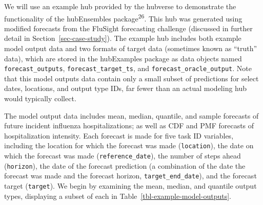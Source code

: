 \documentclass[
  letterpaper,
  DIV=11,
  numbers=noendperiod]{scrartcl}
\begin{document}
We will use an example hub provided by the hubverse to demonstrate the
functionality of the {hubEnsembles} package\textsuperscript{26}. This
hub was generated using modified forecasts from the FluSight forecasting
challenge (discussed in further detail in Section~\ref{sec-case-study}).
The example hub includes both example model output data and two formats
of target data (sometimes known as ``truth'' data), which are stored in
the {hubExamples} package as data objects named
\texttt{forecast\_outputs}, \texttt{forecast\_target\_ts}, and
\texttt{forecast\_oracle\_output}. Note that this model outputs data
contain only a small subset of predictions for select dates, locations,
and output type IDs, far fewer than an actual modeling hub would
typically collect.

The model output data includes mean, median, quantile, and sample
forecasts of future incident influenza hospitalizations; as well as CDF
and PMF forecasts of hospitalization intensity. Each forecast is made
for five task ID variables, including the location for which the
forecast was made (\texttt{location}), the date on which the forecast
was made (\texttt{reference\_date}), the number of steps ahead
(\texttt{horizon}), the date of the forecast prediction (a combination
of the date the forecast was made and the forecast horizon,
\texttt{target\_end\_date}), and the forecast target (\texttt{target}).
We begin by examining the mean, median, and quantile output types,
displaying a subset of each in Table~\ref{tbl-example-model-outputs}.
\end{document}
